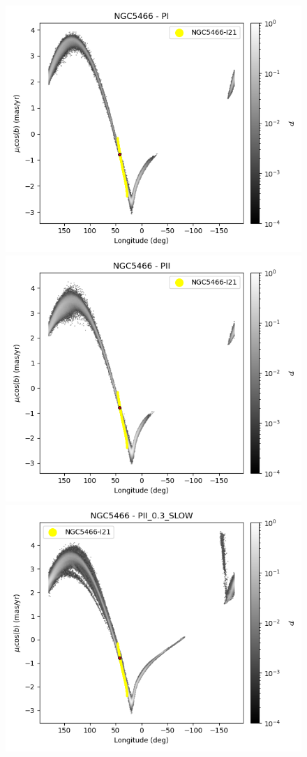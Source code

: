 \begin{figure}
\begin{center}
                    \includegraphics[clip=true, trim = 0mm 0mm 0mm 0mm, width=0.65\columnwidth]{images/PI_individual_NGC5466_galstream-NGC5466-l-pm_l_cosb.png}
                    \includegraphics[clip=true, trim = 0mm 0mm 0mm 0mm, width=0.65\columnwidth]{images/PII_individual_NGC5466_galstream-NGC5466-l-pm_l_cosb.png}
                    \includegraphics[clip=true, trim = 0mm 0mm 0mm 0mm, width=0.65\columnwidth]{images/PII_0.3_SLOW_individual_NGC5466_galstream-NGC5466-l-pm_l_cosb.png}
                        

\end{center}
\end{figure}
